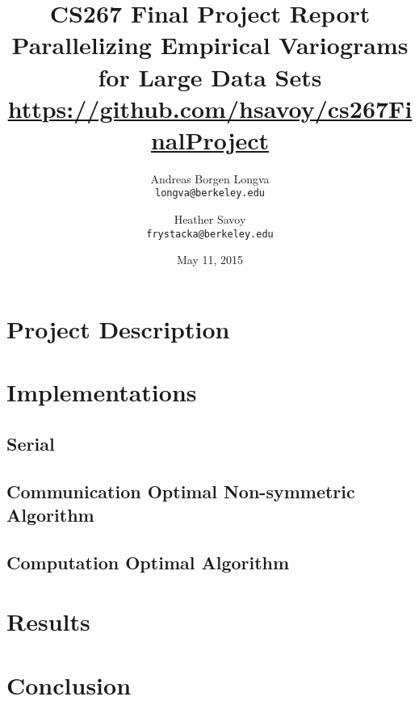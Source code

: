 \documentclass[11pt, oneside,titlepage]{article}   	%
\title{CS267 Final Project Report\\
  \large Parallelizing Empirical Variograms for Large Data Sets\\
  \url{https://github.com/hsavoy/cs267FinalProject}}
\author{Andreas Borgen Longva\\
  \texttt{longva@berkeley.edu}
  \and
  Heather Savoy\\
  \texttt{frystacka@berkeley.edu}}
\date{May 11, 2015}							%
\begin{document}
\maketitle
\section{Project Description}


\section{Implementations}
  \subsection{Serial}
    
  \subsection{Communication Optimal Non-symmetric Algorithm}
    
  \subsection{Computation Optimal Algorithm}
   
   
   \FloatBarrier
\section{Results}
  

   \FloatBarrier
\section{Conclusion}
   
   
   \FloatBarrier



\end{document}
